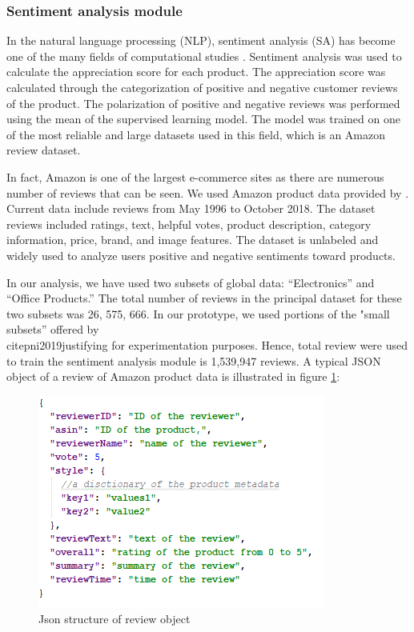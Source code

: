 \documentclass[preprint,3p,onecolumn]{elsarticle}
\begin{document}
\subsubsection{Sentiment analysis module}
\par In the natural language processing (NLP), sentiment analysis (SA) has become one of the many fields of computational studies \citep{bautin2008international}. Sentiment analysis was used to calculate the appreciation score for each product. The appreciation score was calculated through the categorization of positive and negative customer reviews of the product. The polarization of positive and negative reviews was performed using the mean of the supervised learning model. The model was trained on one of the most reliable and large datasets used in this field, which is an Amazon review dataset.
\par In fact, Amazon is one of the largest e-commerce sites as there are numerous number of reviews that can be seen. We used Amazon product data provided by \citep{ni2019justifying}. Current data include reviews from May 1996 to October 2018. The dataset reviews included ratings, text, helpful votes, product description, category information, price, brand, and image features. The dataset is unlabeled and widely used to analyze users positive and negative sentiments toward products.
\par In our analysis, we have used two subsets of global data: “Electronics” and “Office Products.” The total number of reviews in the principal dataset for these two subsets was 26, 575, 666. In our prototype, we used portions of the "small subsets” offered by \\ citep{ni2019justifying} for experimentation purposes. Hence, total review were used to train the sentiment analysis module is 1,539,947 reviews. A typical JSON object of a review of Amazon product data is illustrated in figure \ref{json}: 

\begin{figure}[H]
\centering
\includegraphics[scale=1]{json}
\caption{Json structure of review object}
\label{json}
\end{figure}
\end{document}

